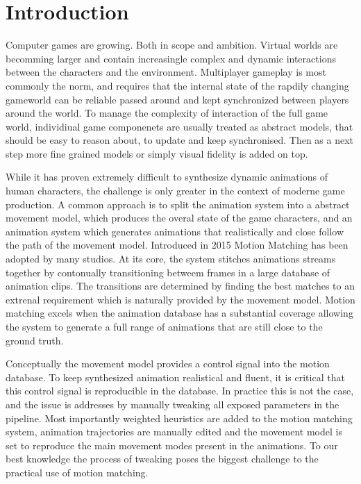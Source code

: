 
\section{Introduction}
Computer games are growing. Both in scope and ambition. Virtual worlds are becomming larger and contain increasingle complex and dynamic interactions between the characters and the environment. Multiplayer gameplay is most commonly the norm, and requires that the internal state of the rapdily changing gameworld can be reliable passed around and kept synchronized between players around the world. To manage the complexity of interaction of the full game world, individiual game componenets are usually treated as abstract models, that should be easy to reason about, to update and keep synchronised. Then as a next step more fine grained models or simply visual fidelity is added on top. 

While it has proven extremely difficult to synthesize dynamic animations of human characters, the challenge is only greater in the context of moderne game production. A common approach is to split the animation system into a abstract movement model, which produces the overal state of the game characters, and an animation system which generates animations that realistically and close follow the path of the movement model. Introduced in 2015 Motion Matching has been adopted by many studios. At its core, the system stitches animations streams together by contonually transitioning betweem frames in a large database of animation clips. The transitions are determined by finding the best matches to an extrenal requirement which is naturally provided by the movement model. Motion matching excels when the animation database has a substantial coverage allowing the system to generate a full range of animations that are still close to the ground truth. 

Conceptually the movement model provides a control signal into the motion database. To keep synthesized animation realistical and fluent, it is critical that this control signal is reproducible in the database. In practice this is not the case, and the issue is addresses by manually tweaking all exposed parameters in the pipeline. Most importantly weighted heuristics are added to the motion matching system, animation trajectories are manually edited and the movement model is set to reproduce the main movement modes present in the animations. To our best knowledge the process of tweaking poses the biggest challenge to the practical use of motion matching.  

